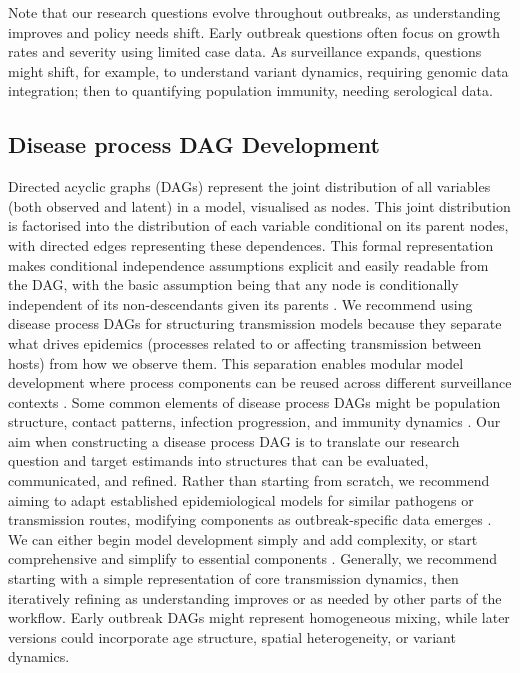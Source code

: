 \documentclass{article}
\begin{document}
Note that our research questions evolve throughout outbreaks, as understanding improves and policy needs shift. Early outbreak questions often focus on growth rates and severity using limited case data. As surveillance expands, questions might shift, for example, to understand variant dynamics, requiring genomic data integration; then to quantifying population immunity, needing serological data.

\subsection{Disease process DAG Development} \label{sec:process}

Directed acyclic graphs (DAGs) represent the joint distribution of all variables (both observed and latent) in a model, visualised as nodes. This joint distribution is factorised into the distribution of each variable conditional on its parent nodes, with directed edges representing these dependences. This formal representation makes conditional independence assumptions explicit and easily readable from the DAG, with the basic assumption being that any node is conditionally independent of its non-descendants given its parents \citep{lauritzen1996}. We recommend using disease process DAGs for structuring transmission models because they separate what drives epidemics (processes related to or affecting transmission between hosts) from how we observe them.  
This separation enables modular model development where process components can be reused across different surveillance contexts \citep{nicholson2022interoperability}.
Some common elements of disease process DAGs might be population structure, contact patterns, infection progression, and immunity dynamics \citep{deangelis2018analysing}. 
Our aim when constructing a disease process DAG is to translate our research question and target estimands into structures that can be evaluated, communicated, and refined.
Rather than starting from scratch, we recommend aiming to adapt established epidemiological models for similar pathogens or transmission routes, modifying components as outbreak-specific data emerges \citep{gelman2020bayesian}.
We can either begin model development simply and add complexity, or start comprehensive and simplify to essential components \citep{gelman2020bayesian}.
Generally, we recommend starting with a simple representation of core transmission dynamics, then iteratively refining as understanding improves or as needed by other parts of the workflow.
Early outbreak DAGs might represent homogeneous mixing, while later versions could incorporate age structure, spatial heterogeneity, or variant dynamics.
\end{document}
